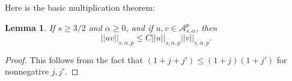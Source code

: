 \documentclass[12pt]{article}
\newtheorem{lem}[thm]{Lemma}
\newtheorem{rem}[thm]{Remark}
\newcommand{\del}{\partial}
\newcommand{\calA}{{\mathcal A}}
\begin{document}





Here is the basic multiplication theorem: 
\begin{lem}
If $s \geq 3/2$ and $\alpha \geq 0$, and if $u, v \in \calA^p_{s,\alpha}$, then
\[
||uv||_{s,\alpha,p} \leq C ||u||_{s,\alpha,p} ||v||_{s,\alpha,p}.
\]
\end{lem}
\begin{proof}
This follows from the fact that $(1+j +j')\leqslant(1+j)(1+j')$ for nonnegative $j,j'$.
\end{proof}
\end{document}
